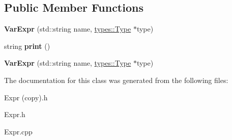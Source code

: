\subsection*{Public Member Functions}
\begin{DoxyCompactItemize}
\item 
\mbox{\label{classspan_1_1ir_1_1expr_1_1VarExpr_af0fa2247c637ded44142cb9d353d4088}} 
{\bfseries Var\+Expr} (std\+::string name, \hyperlink{classspan_1_1ir_1_1types_1_1Type}{types\+::\+Type} $\ast$type)
\item 
\mbox{\label{classspan_1_1ir_1_1expr_1_1VarExpr_ab051b88957e6a5b513f5d28e4e681e97}} 
string {\bfseries print} ()
\item 
\mbox{\label{classspan_1_1ir_1_1expr_1_1VarExpr_aba5a66e93f6405f5eefa2bf592697066}} 
{\bfseries Var\+Expr} (std\+::string name, \hyperlink{classspan_1_1ir_1_1types_1_1Type}{types\+::\+Type} $\ast$type)
\end{DoxyCompactItemize}


The documentation for this class was generated from the following files\+:\begin{DoxyCompactItemize}
\item 
Expr (copy).\+h\item 
Expr.\+h\item 
Expr.\+cpp\end{DoxyCompactItemize}
